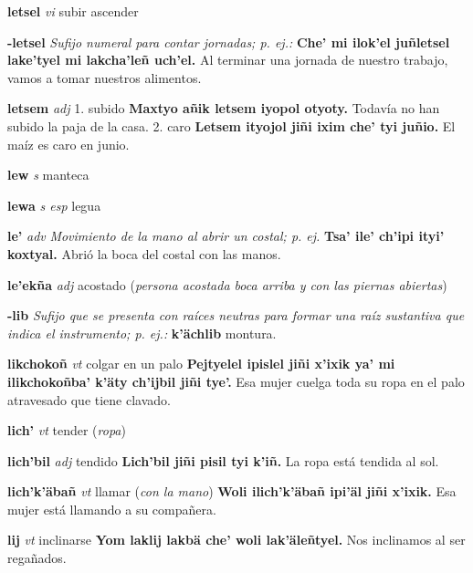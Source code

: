\documentclass[10pt]{scrbook}
\newcommand{\entry}[1]{\textbf{#1}}
\newcommand{\onedefinition}[1]{#1.}
\newcommand{\nontranslationdef}[1]{\textit{#1}}
\newcommand{\partofspeech}[1]{\textit{#1}}
\newcommand{\spanishtranslation}[1]{#1}
\newcommand{\clarification}[1]{(\textit{#1})}
\newcommand{\cholexample}[1]{\textbf{#1}}
\newcommand{\exampletranslation}[1]{#1}
\begin{document}
\begin{multicols}{2}
\entry{letsel}
\partofspeech{vi}
\spanishtranslation{subir}
\spanishtranslation{ascender}

\entry{-letsel}
\nontranslationdef{Sufijo numeral para contar jornadas; p. ej.:}
\cholexample{Che' mi ilok'el juñletsel lake'tyel mi lakcha'leñ uch'el.}
\exampletranslation{Al terminar una jornada de nuestro trabajo, vamos a tomar nuestros alimentos.}

\entry{letsem}
\partofspeech{adj}
\onedefinition{1}
\spanishtranslation{subido}
\cholexample{Maxtyo añik letsem iyopol otyoty.}
\exampletranslation{Todavía no han subido la paja de la casa.}
\onedefinition{2}
\spanishtranslation{caro}
\cholexample{Letsem ityojol jiñi ixim che' tyi juñio.}
\exampletranslation{El maíz es caro en junio.}

\entry{lew}
\partofspeech{s}
\spanishtranslation{manteca}

\entry{lewa}
\partofspeech{s esp}
\spanishtranslation{legua}

\entry{le'}
\partofspeech{adv}
\nontranslationdef{Movimiento de la mano al abrir un costal; p. ej.}
\cholexample{Tsa' ile' ch'ipi ityi' koxtyal.}
\exampletranslation{Abrió la boca del costal con las manos.}

\entry{le'ekña}
\partofspeech{adj}
\spanishtranslation{acostado}
\clarification{persona acostada boca arriba y con las piernas abiertas}

\entry{-lib}
\nontranslationdef{Sufijo que se presenta con raíces neutras para formar una raíz sustantiva que indica el instrumento; p. ej.:}
\cholexample{k'ächlib}
\exampletranslation{montura.}

\entry{likchokoñ}
\partofspeech{vt}
\spanishtranslation{colgar en un palo}
\cholexample{Pejtyelel ipislel jiñi x'ixik ya' mi ilikchokoñba' k'äty ch'ijbil jiñi tye'.}
\exampletranslation{Esa mujer cuelga toda su ropa en el palo atravesado que tiene clavado.}

\entry{lich'}
\partofspeech{vt}
\spanishtranslation{tender}
\clarification{ropa}

\entry{lich'bil}
\partofspeech{adj}
\spanishtranslation{tendido}
\cholexample{Lich'bil jiñi pisil tyi k'iñ.}
\exampletranslation{La ropa está tendida al sol.}

\entry{lich'k'äbañ}
\partofspeech{vt}
\spanishtranslation{llamar}
\clarification{con la mano}
\cholexample{Woli ilich'k'äbañ ipi'äl jiñi x'ixik.}
\exampletranslation{Esa mujer está llamando a su compañera.}

\entry{lij}
\partofspeech{vt}
\spanishtranslation{inclinarse}
\cholexample{Yom laklij lakbä che' woli lak'äleñtyel.}
\exampletranslation{Nos inclinamos al ser regañados.}


\end{multicols}
\end{document}
